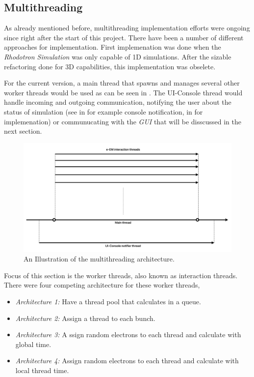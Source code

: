 \documentclass[a4paper,oneside,12pt]{report}
\numberwithin{equation}{chapter}
\begin{document}
\subsection{Multithreading}
As already mentioned before, multithreading implementation efforts were ongoing since right after the start of this project. 
There have been a number of different approaches for implementation. 
First implemenation was done when the \textit{Rhodotron Simulation} was only capable of 1D simulations.
After the sizable refactoring done for 3D capabilities, this implementation was obselete. 

For the current version, a main thread that spawns and manages several other worker threads would be used as can be seen in .
The UI-Console thread would handle incoming and outgoing communication, notifying the user about the status of simulation 
(see  in  for example console notification,  in  for implemenation)
or communucating with the \textit{GUI} that will be disscussed in the next section.

\begin{figure}[H]
    \centering
    \includegraphics[width=\linewidth]{./figures/illustrations/multh_arc.png}
    \vspace{20pt}
    \caption{An Illustration of the multithreading architecture.}
    \label{fig:multh_illustration}
\end{figure}

Focus of this section is the worker threads, also known as \eEM interaction threads.
There were four competing architecture for these worker threads,
\begin{itemize}
    \item \textit{Architecture 1:} Have a thread pool that calculates \eEM in a queue. 
    \item \textit{Architecture 2:} Assign a thread to each bunch.
    \item \textit{Architecture 3:} A ssign random electrons to each thread and calculate \eEM with global time.
    \item \textit{Architecture 4:} Assign random electrons to each thread and calculate \eEM with local thread time.
\end{itemize}
\end{document}
